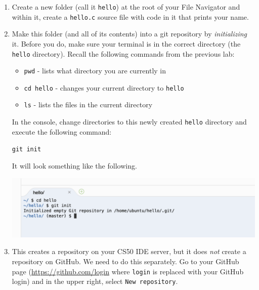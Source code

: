 \documentclass[12pt]{scrartcl}
\begin{document}
\begin{enumerate}
  \item Create a new folder (call it \texttt{hello}) 
  at the root of your File Navigator and within it, create a 
  \texttt{hello.c} source file with code in it that
  prints your name.
  
  \item Make this folder (and all of its contents) into a git
  repository by \emph{initializing} it.  Before you do, make sure
  your terminal is in the correct directory (the \texttt{hello}
  directory).  Recall the following commands from the previous lab:
  \begin{itemize}
    \item \texttt{pwd} - lists what directory you are currently in
    \item \texttt{cd hello} - changes your current directory to 
    \texttt{hello}
    \item \texttt{ls} - lists the files in the current directory
  \end{itemize}
  
  In the console, change directories to this newly created 
  \texttt{hello}
  directory and execute the following command:
  
  \texttt{git init}
  
  It will look something like the following.
  \begin{center}
  \includegraphics[scale=0.50]{./hack1.0-files/cl-gitinit.png}
  \end{center}

  \item This creates a repository on your CS50 IDE server, but it
  does \emph{not} create a repository on GitHub.  We need to do 
  this separately.  Go to your GitHub page (\url{https://github.com/login}
  where \texttt{login} is replaced with your GitHub
  login) and in the upper right, select \texttt{New repository}.


\end{enumerate}
\end{document}
